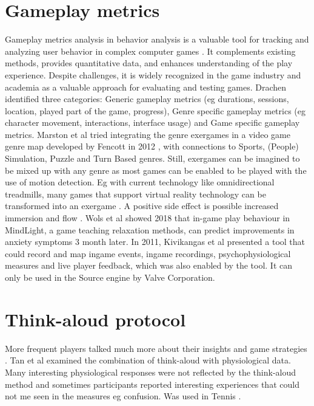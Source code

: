 \section{Gameplay metrics}
Gameplay metrics analysis in behavior analysis is a valuable tool for tracking and analyzing user behavior in complex computer games \cite{drachen2015behavioral}. It complements existing methods, provides quantitative data, and enhances understanding of the play experience. Despite challenges, it is widely recognized in the game industry and academia as a valuable approach for evaluating and testing games. Drachen identified three categories: Generic gameplay metrics (eg durations, sessions, location, played part of the game, progress), Genre specific gameplay metrics (eg character movement, interactions, interface usage) and Game specific gameplay metrics.
Marston et al \cite{marston2013play} tried integrating the genre exergames in a video game genre map developed by Fencott in 2012 \cite{clay2012game}, with connections to Sports, (People) Simulation, Puzzle and Turn Based genres. Still, exergames can be imagined to be mixed up with any genre as most games can be enabled to be played with the use of motion detection. Eg with current technology like omnidirectional treadmills, many games that support virtual reality technology can be transformed into an exergame \cite{link_katvr}. A positive side effect is possible increased immersion and flow \cite{wehden2021slippery}.
Wols et al \cite{wols2018game} showed 2018 that in-game play behaviour in MindLight, a game teaching relaxation methods, can predict improvements in anxiety symptoms 3 month later.
In 2011, Kivikangas et al \cite{kivikangas2011developing} presented a tool that could record and map ingame events, ingame recordings, psychophysiological measures and live player feedback, which was also enabled by the tool. It can only be used in the Source engine by Valve Corporation.


\section{Think-aloud protocol}
More frequent players talked much more about their insights and game strategies \cite{blumberg2008impasse}.
Tan et al examined the combination of think-aloud with physiological data. Many interesting physiological responses were not reflected by the think-aloud method and sometimes participants reported interesting experiences that could not me seen in the measures eg confusion.
Was used in Tennis \cite{swettenham2020investigating}.

